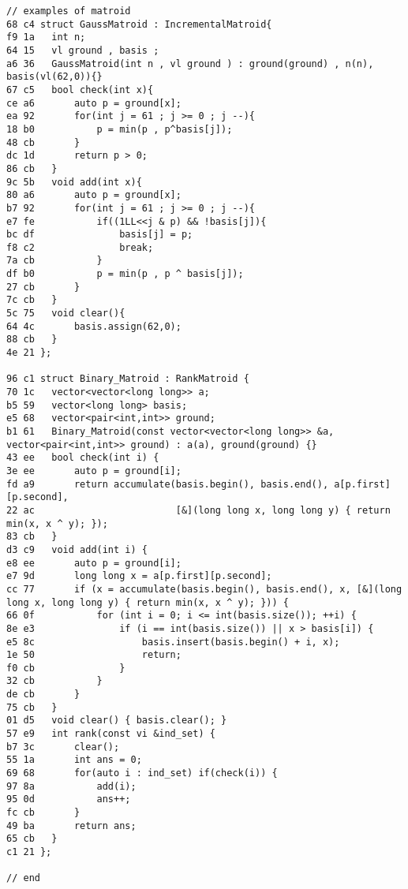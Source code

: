 \documentclass[11pt, a4paper, twoside]{article}
\begin{document}
\begin{lstlisting}
// examples of matroid
68 c4 struct GaussMatroid : IncrementalMatroid{
f9 1a 	int n;
64 15 	vl ground , basis ;
a6 36 	GaussMatroid(int n , vl ground ) : ground(ground) , n(n), basis(vl(62,0)){}
67 c5 	bool check(int x){
ce a6 		auto p = ground[x];
ea 92 		for(int j = 61 ; j >= 0 ; j --){
18 b0 			p = min(p , p^basis[j]);
48 cb 		}
dc 1d 		return p > 0;
86 cb 	}
9c 5b 	void add(int x){
80 a6 		auto p = ground[x];
b7 92 		for(int j = 61 ; j >= 0 ; j --){
e7 fe 			if((1LL<<j & p) && !basis[j]){
bc df 				basis[j] = p;
f8 c2 				break;
7a cb 			} 
df b0 			p = min(p , p ^ basis[j]);
27 cb 		}
7c cb 	}
5c 75 	void clear(){
64 4c 		basis.assign(62,0);
88 cb 	}
4e 21 };

96 c1 struct Binary_Matroid : RankMatroid {
70 1c 	vector<vector<long long>> a;
b5 59 	vector<long long> basis;
e5 68 	vector<pair<int,int>> ground;
b1 61 	Binary_Matroid(const vector<vector<long long>> &a, vector<pair<int,int>> ground) : a(a), ground(ground) {}
43 ee 	bool check(int i) {
3e ee 		auto p = ground[i];
fd a9 		return accumulate(basis.begin(), basis.end(), a[p.first][p.second],
22 ac 						  [&](long long x, long long y) { return min(x, x ^ y); });
83 cb 	}
d3 c9 	void add(int i) {
e8 ee 		auto p = ground[i];
e7 9d 		long long x = a[p.first][p.second];
cc 77 		if (x = accumulate(basis.begin(), basis.end(), x, [&](long long x, long long y) { return min(x, x ^ y); })) {
66 0f 			for (int i = 0; i <= int(basis.size()); ++i) {
8e e3 				if (i == int(basis.size()) || x > basis[i]) {
e5 8c 					basis.insert(basis.begin() + i, x);
1e 50 					return;
f0 cb 				}
32 cb 			}
de cb 		}
75 cb 	}
01 d5 	void clear() { basis.clear(); }
57 e9 	int rank(const vi &ind_set) {
b7 3c 		clear();
55 1a 		int ans = 0;
69 68 		for(auto i : ind_set) if(check(i)) {
97 8a 			add(i);
95 0d 			ans++;
fc cb 		}
49 ba 		return ans;
65 cb 	}
c1 21 };
 
// end
\end{lstlisting}
\end{document}
